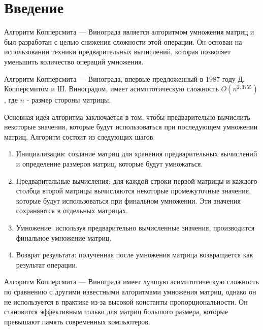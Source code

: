 \chapter*{Введение}

Алгоритм Копперсмита — Винограда является алгоритмом умножения матриц и был разработан с целью снижения сложности этой операции. Он основан на использовании техники предварительных вычислений, которая позволяет уменьшить количество операций умножения.


Алгоритм Копперсмита — Винограда, впервые предложенный в 1987 году Д. Копперсмитом и Ш. Виноградом, имеет асимптотическую сложность $O(n^{2,3755})$, где $n$ - размер стороны матрицы.


Основная идея алгоритма заключается в том, чтобы предварительно вычислить некоторые значения, которые будут использоваться при последующем умножении матриц. Алгоритм состоит из следующих шагов:
\begin{enumerate}
	\item Инициализация: создание матриц для хранения предварительных вычислений и определение размеров матриц, которые будут умножаться.
	\item Предварительные вычисления: для каждой строки первой матрицы и каждого столбца второй матрицы вычисляются некоторые промежуточные значения, которые будут использоваться при финальном умножении. Эти значения сохраняются в отдельных матрицах.
	\item Умножение: используя предварительно вычисленные значения, производится финальное умножение матриц.
	\item Возврат результата: полученная после умножения матрица возвращается как результат операции.
\end{enumerate}


Алгоритм Копперсмита — Винограда имеет лучшую асимптотическую сложность по сравнению с другими известными алгоритмами умножения матриц, однако он не используется в практике из-за высокой константы пропорциональности. Он становится эффективным только для матриц большого размера, которые превышают память современных компьютеров.

\newpage